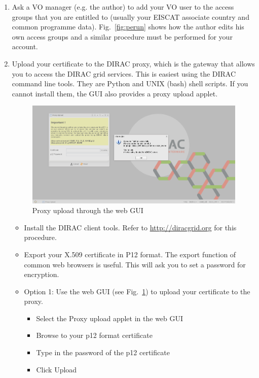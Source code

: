 \documentclass[a4paper]{article}
\begin{document}
\begin{enumerate}
\item Ask a VO manager (e.g. the author) to add your VO user to the
  access groups that you are entitled to (usually your EISCAT
  associate country and common programme data). Fig.~\ref{fig:perun}
  shows how the author edits his own access groups and a similar
  procedure must be performed for your account.

\item Upload your certificate to the DIRAC proxy, which is the gateway
  that allows you to access the DIRAC grid services. This is easiest
  using the DIRAC command line tools. They are Python and UNIX (bash)
  shell scripts. If you cannot install them, the GUI also provides a proxy upload applet.

  \begin{figure}[htb]
    \centering
    \includegraphics[width=1.0\linewidth]{dirac-gui-proxy}
    \caption{Proxy upload through the web GUI}
    \label{fig:proxygui}
  \end{figure}
  
  \begin{itemize}
  \item Install the DIRAC client tools. Refer to \url{http://diracgrid.org} for this procedure.
  
  \item Export your X.509 certificate in P12 format. The export
    function of common web browsers is useful. This will ask you to
    set a password for encryption.

    
  \item Option 1: Use the web GUI (see Fig.~\ref{fig:proxygui}) to upload your certificate to the proxy.
    \begin{itemize}
    \item Select the Proxy upload applet in the web GUI
    \item Browse to  your p12 format certificate
    \item Type in the password of the p12 certificate
    \item Click Upload
    \end{itemize}


\end{itemize}
\end{enumerate}
\end{document}
